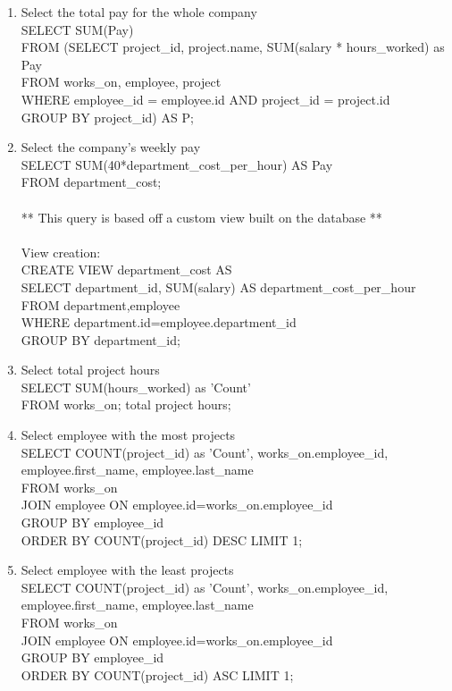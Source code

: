 \documentclass[fleqn, 11pt,letterpaper]{article}
\begin{document}
\begin{enumerate}
	\pagebreak
		\item Select the total pay for the whole company \\SELECT SUM(Pay) \\FROM (SELECT project\_id, project.name, SUM(salary * hours\_worked) as Pay \\FROM works\_on, employee, project \\WHERE employee\_id = employee.id AND project\_id = project.id \\GROUP BY project\_id) AS P;
		\item Select the company's weekly pay \\SELECT SUM(40*department\_cost\_per\_hour) AS Pay \\FROM department\_cost;\\ \\ ** This query is based off a custom view built on the database ** \\ \\ View creation: \\ CREATE VIEW department\_cost AS\\ SELECT department\_id, SUM(salary) AS department\_cost\_per\_hour \\FROM department,employee \\WHERE 									department.id=employee.department\_id \\GROUP BY department\_id;
		\item Select total project hours \\SELECT SUM(hours\_worked) as 'Count' \\FROM works\_on; total project hours;
		\item Select employee with the most projects \\SELECT COUNT(project\_id) as 'Count', works\_on.employee\_id, employee.first\_name, employee.last\_name \\FROM works\_on \\JOIN employee ON employee.id=works\_on.employee\_id \\GROUP BY employee\_id \\ORDER BY COUNT(project\_id) DESC LIMIT 1;
		\item Select employee with the least projects \\SELECT COUNT(project\_id) as 'Count', works\_on.employee\_id, employee.first\_name, employee.last\_name \\FROM works\_on \\JOIN employee ON employee.id=works\_on.employee\_id \\GROUP BY employee\_id \\ORDER BY COUNT(project\_id) ASC LIMIT 1;

\end{enumerate}
\end{document}
